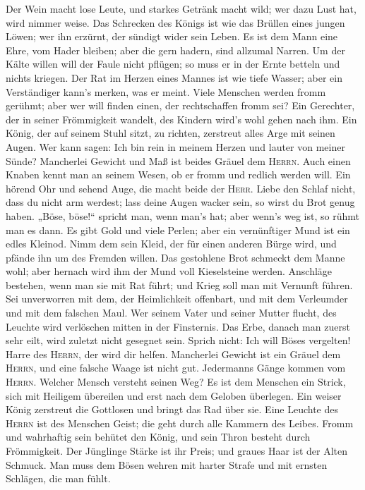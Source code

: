  Der Wein macht lose Leute, und starkes Getränk macht
wild; wer dazu Lust hat, wird nimmer weise.  Das Schrecken
des Königs ist wie das Brüllen eines jungen Löwen; wer ihn erzürnt, der
sündigt wider sein Leben.  Es ist dem Mann eine Ehre, vom
Hader bleiben; aber die gern hadern, sind allzumal Narren.
 Um der Kälte willen will der Faule nicht pflügen; so muss
er in der Ernte betteln und nichts kriegen.  Der Rat im
Herzen eines Mannes ist wie tiefe Wasser; aber ein Verständiger kann's
merken, was er meint.  Viele Menschen werden fromm
gerühmt; aber wer will finden einen, der rechtschaffen fromm sei?
 Ein Gerechter, der in seiner Frömmigkeit wandelt, des
Kindern wird's wohl gehen nach ihm.  Ein König, der auf
seinem Stuhl sitzt, zu richten, zerstreut alles Arge mit seinen Augen.
 Wer kann sagen: Ich bin rein in meinem Herzen und lauter
von meiner Sünde?  Mancherlei Gewicht und Maß ist beides
Gräuel dem \textsc{Herrn}.  Auch einen Knaben kennt man
an seinem Wesen, ob er fromm und redlich werden will. 
Ein hörend Ohr und sehend Auge, die macht beide der \textsc{Herr}.
 Liebe den Schlaf nicht, dass du nicht arm werdest; lass
deine Augen wacker sein, so wirst du Brot genug haben. 
„Böse, böse!{}`` spricht man, wenn man's hat; aber wenn's weg ist, so
rühmt man es dann.  Es gibt Gold und viele Perlen; aber
ein vernünftiger Mund ist ein edles Kleinod.  Nimm dem
sein Kleid, der für einen anderen Bürge wird, und pfände ihn um des
Fremden willen.  Das gestohlene Brot schmeckt dem Manne
wohl; aber hernach wird ihm der Mund voll Kieselsteine werden.
 Anschläge bestehen, wenn man sie mit Rat führt; und
Krieg soll man mit Vernunft führen.  Sei unverworren mit
dem, der Heimlichkeit offenbart, und mit dem Verleumder und mit dem
falschen Maul.  Wer seinem Vater und seiner Mutter
flucht, des Leuchte wird verlöschen mitten in der Finsternis.
 Das Erbe, danach man zuerst sehr eilt, wird zuletzt
nicht gesegnet sein.  Sprich nicht: Ich will Böses
vergelten! Harre des \textsc{Herrn}, der wird dir helfen.
 Mancherlei Gewicht ist ein Gräuel dem \textsc{Herrn},
und eine falsche Waage ist nicht gut.  Jedermanns Gänge
kommen vom \textsc{Herrn}. Welcher Mensch versteht seinen Weg?
 Es ist dem Menschen ein Strick, sich mit Heiligem
übereilen und erst nach dem Geloben überlegen.  Ein
weiser König zerstreut die Gottlosen und bringt das Rad über sie.
 Eine Leuchte des \textsc{Herrn} ist des Menschen Geist;
die geht durch alle Kammern des Leibes.  Fromm und
wahrhaftig sein behütet den König, und sein Thron besteht durch
Frömmigkeit.  Der Jünglinge Stärke ist ihr Preis; und
graues Haar ist der Alten Schmuck.  Man muss dem Bösen
wehren mit harter Strafe und mit ernsten Schlägen, die man fühlt.


